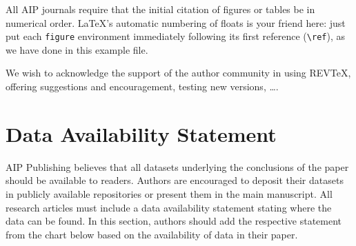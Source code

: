 \documentclass[%
 aip,
 amsmath,amssymb,
preprint,%
]{revtex4-1}
\begin{document}
All AIP journals require that the initial citation of
figures or tables be in numerical order.
\LaTeX's automatic numbering of floats is your friend here:
just put each \texttt{figure} environment immediately following 
its first reference (\verb+\ref+), as we have done in this example file. 

\begin{acknowledgments}
We wish to acknowledge the support of the author community in using
REV\TeX{}, offering suggestions and encouragement, testing new versions,
\dots.
\end{acknowledgments}

\section*{Data Availability Statement}

AIP Publishing believes that all datasets underlying the conclusions of the paper should be available to readers. Authors are encouraged to deposit their datasets in publicly available repositories or present them in the main manuscript. All research articles must include a data availability statement stating where the data can be found. In this section, authors should add the respective statement from the chart below based on the availability of data in their paper.
\end{document}
